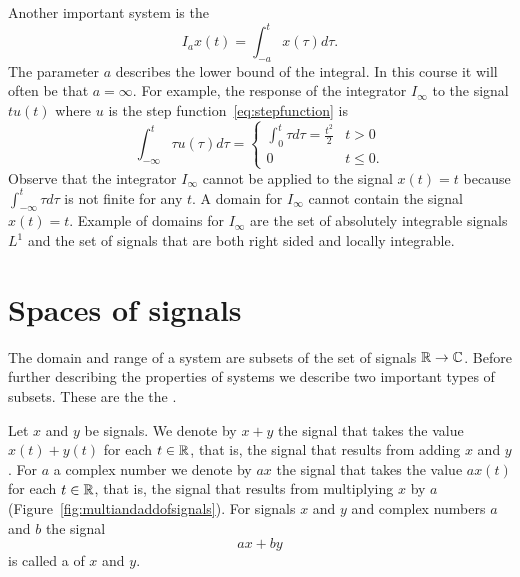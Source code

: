 
Another important system is the 
\[
I_a x(t) = \int_{-a}^{t} x(\tau) d\tau.
\]
The parameter $a$ describes the lower bound of the integral.  In this course it will often be that $a=\infty$.  For example, the response of the integrator $I_{\infty}$ to the signal $t u(t)$ where $u$ is the step function~\eqref{eq:stepfunction} is
\[
\int_{-\infty}^{t} \tau u(\tau) d\tau = \begin{cases}
\int_{0}^{t} \tau d\tau = \frac{t^2}{2} & t > 0 \\
0 & t \leq 0.
\end{cases}
\]
Observe that the integrator $I_\infty$ cannot be applied to the signal $x(t) = t$ because $\int_{-\infty}^{t} \tau d\tau$ is not finite for any $t$.  A domain for $I_\infty$ cannot contain the signal $x(t) = t$.  Example of domains for $I_\infty$ are the set of absolutely integrable signals $L^1$ and the set of signals that are both right sided and locally integrable.


\section{Spaces of signals}\label{sec:spaces-signals}

The domain and range of a system are subsets of the set of signals ${\mathbb R} \to {\mathbb C}$. Before further describing the properties of systems we describe two important types of subsets.  These are the  the .  

Let $x$ and $y$ be signals.  We denote by $x + y$ the signal that takes the value $x(t) + y(t)$ for each $t  \in {\mathbb R}$, that is, the signal that results from adding $x$ and $y$.  For $a$ a complex number we denote by $ax$ the signal that takes the value $a x(t)$ for each $t \in {\mathbb R}$, that is, the signal that results from multiplying $x$ by $a$ (Figure~\ref{fig:multiandaddofsignals}).  For signals $x$ and $y$ and complex numbers $a$ and $b$ the signal
\[
ax + by
\]
is called a  of $x$ and $y$.  %

